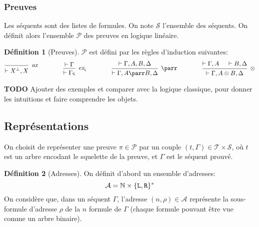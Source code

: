 \documentclass[11pt,a4paper]{article}
\theoremstyle{plain}
\theoremstyle{definition}
\newtheorem{definition}{Définition}
\theoremstyle{remark}
\newcommand*{\orth}{^\perp}
\newcommand*{\tensor}{\otimes}
\newcommand*{\hypv}[1]{\hypo{\vdash #1}}
\newcommand*{\axv}[1]{\infer{0}[\ensuremath{\mathit{ax}}]{\vdash #1}}
\newcommand*{\tensorv}[1]{\infer{2}[\ensuremath{\tensor}]{\vdash #1}}
\newcommand*{\parrv}[1]{\infer{1}[\ensuremath{\parr}]{\vdash #1}}
\newcommand*{\permv}[2]{\infer{1}[\ensuremath{\textit{ex}_{#1}}]{\vdash #2}}
\newcommand*{\permapp}[2]{#2 #1}
\newcommand*{\someperm}{\varsigma}
\newcommand*{\someproof}{\pi}
\newcommand*{\sequent}{\Gamma}
\newcommand*{\sequentbis}{\Delta}
\newcommand*{\Left}{\textnormal{\texttt{L}}}
\newcommand*{\Right}{\textnormal{\texttt{R}}}
\newcommand*{\proofs}{\ensuremath{\mathcal{P}}}
\newcommand*{\sequents}{\ensuremath{\mathcal{S}}}
\newcommand*{\trees}{\ensuremath{\mathcal{T}}}
\newcommand*{\representationslarge}{\ensuremath{\trees \times \sequents}}
\newcommand*{\todo}{{\normalfont \textbf{TODO}} }
\begin{document}
\subsubsection{Preuves}
Les séquents sont des listes de formules. On note $\sequents$ l'ensemble des séquents. On définit alors l'ensemble \proofs{} des preuves en logique linéaire.
\begin{definition}[Preuves]
\proofs{} est défini par les règles d'induction suivantes:
\begin{equation*}
\begin{prooftree}
  \axv{X\orth, X}
\end{prooftree}
\qquad\qquad
\begin{prooftree}
  \hypv{\sequent}
  \permv{\someperm}{\permapp{\someperm}{\sequent}}
\end{prooftree}
\qquad\qquad
\begin{prooftree}
  \hypv{\sequent, A, B, \sequentbis}
  \parrv{\sequent, A \parr B, \sequentbis}
\end{prooftree}
\qquad\qquad
\begin{prooftree}
  \hypv{\sequent, A}
  \hypv{B, \sequentbis}
  \tensorv{\sequent, A \tensor B, \sequentbis}
\end{prooftree}
\end{equation*}
\end{definition}

\todo{Ajouter des exemples et comparer avec la logique classique, pour donner les intuitions et faire comprendre les objets.}

\subsection{Représentations}
On choisit de représenter une preuve $\someproof \in \mathcal{P}$ par un couple $(t, \sequent) \in \representationslarge$, où $t$ est un arbre encodant le squelette de la preuve, et $\sequent$ est le séquent prouvé.

\begin{definition}[Adresses]
On définit d'abord un ensemble d'adresses:
\begin{equation*}
\mathcal{A} = \mathbb{N} \times \{ \Left, \Right\}^{*}  
\end{equation*}
On considère que, dans un séquent $\sequent$, l'adresse $(n, \rho) \in \mathcal{A}$ représente la sous-formule d'adresse $\rho$ de la $n$\ieme{} formule de $\sequent$ (chaque formule pouvant être vue comme un arbre binaire).
\end{definition}
\end{document}
